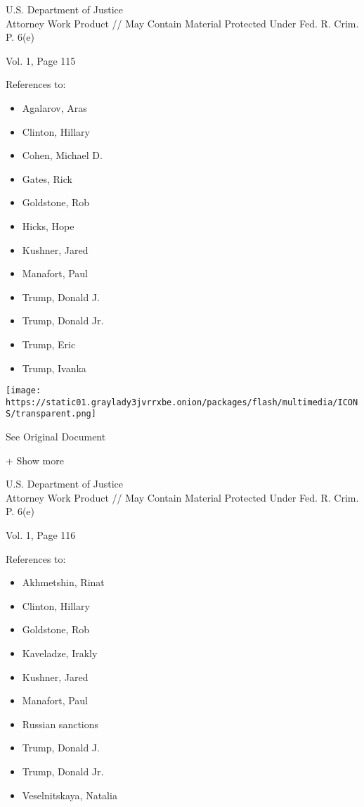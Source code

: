 U.S. Department of Justice\\
Attorney Work Product // May Contain Material Protected Under Fed. R.
Crim. P. 6(e)

Vol. 1, Page 115

References to:

\begin{itemize}
\tightlist
\item
  Agalarov, Aras
\item
  Clinton, Hillary
\item
  Cohen, Michael D.
\item
  Gates, Rick
\item
  Goldstone, Rob
\item
  Hicks, Hope
\item
  Kushner, Jared
\item
  Manafort, Paul 
\item
  Trump, Donald J.
\item
  Trump, Donald Jr.
\item
  Trump, Eric
\item
  Trump, Ivanka
\end{itemize}

\protect\hyperlink{}{}

\texttt{[image: https://static01.graylady3jvrrxbe.onion/packages/flash/multimedia/ICONS/transparent.png]}

See Original Document

+ Show more

U.S. Department of Justice\\
Attorney Work Product // May Contain Material Protected Under Fed. R.
Crim. P. 6(e)

Vol. 1, Page 116

References to:

\begin{itemize}
\tightlist
\item
  Akhmetshin, Rinat
\item
  Clinton, Hillary
\item
  Goldstone, Rob
\item
  Kaveladze, Irakly
\item
  Kushner, Jared
\item
  Manafort, Paul 
\item
  Russian sanctions
\item
  Trump, Donald J.
\item
  Trump, Donald Jr.
\item
  Veselnitskaya, Natalia
\end{itemize}

